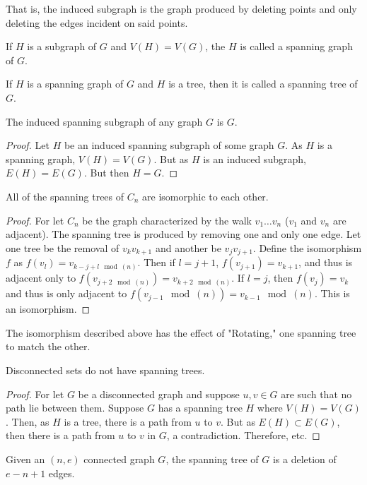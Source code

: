     That is, the induced subgraph is the graph produced by deleting points
    and only deleting the edges incident on said points.
    \begin{definition}
    If $H$ is a subgraph of $G$ and $V(H)=V(G)$, the $H$ is called a spanning graph of $G$.
    \end{definition}
    \begin{definition}
    If $H$ is a spanning graph of $G$ and $H$ is a tree, then it is called a spanning tree of $G$.
    \end{definition}
    \begin{theorem}
    The induced spanning subgraph of any graph $G$ is $G$.
    \end{theorem}
    \begin{proof}
    Let $H$ be an induced spanning subgraph of some graph $G$. As $H$ is a spanning graph, $V(H)=V(G)$. But as $H$ is an induced subgraph, $E(H)=E(G)$. But then $H=G$.
    \end{proof}
    \begin{theorem}
    All of the spanning trees of $C_n$ are isomorphic to each other.
    \end{theorem}
    \begin{proof}
    For let $C_n$ be the graph characterized by the walk $v_1\hdots v_n$ ($v_1$ and $v_n$ are adjacent). The spanning tree is produced by removing one and only one edge. Let one tree be the removal of $v_{k}v_{k+1}$ and another be $v_{j}v_{j+1}$. Define the isomorphism $f$ as $f(v_l) = v_{k-j+l \mod(n)}$. Then if $l=j+1$, $f(v_{j+1}) = v_{k+1}$, and thus is adjacent only to $f(v_{j+2 \mod(n)}) = v_{k+2\mod(n)}$. If $l=j$, then $f(v_j) = v_k$ and thus is only adjacent to $f(v_{j-1}\mod(n)) = v_{k-1}\mod(n)$. This is an isomorphism.
    \end{proof}
    The isomorphism described above has the effect of "Rotating," one spanning tree to match the other.
    \begin{theorem}
    Disconnected sets do not have spanning trees.
    \end{theorem}
    \begin{proof}
    For let $G$ be a disconnected graph and suppose $u,v\in G$ are such that no path lie between them. Suppose $G$ has a spanning tree $H$ where $V(H)=V(G)$. Then, as $H$ is a tree, there is a path from $u$ to $v$. But as $E(H)\subset E(G)$, then there is a path from $u$ to $v$ in $G$, a contradiction. Therefore, etc.
    \end{proof}
    \begin{theorem}
    Given an $(n,e)$ connected graph $G$, the spanning tree of $G$ is a deletion of $e-n+1$ edges.
    \end{theorem}
